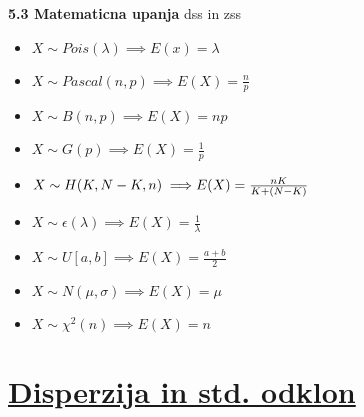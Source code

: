 \documentclass{article}
\begin{document}
\begin{multicols}{3}
\textbf{5.3 Matematicna upanja} dss in zss
\begin{itemize}
    \item \begin{math}
        X \sim Pois(\lambda) \implies E(x) = \lambda
    \end{math}
    \item \begin{math}
        X \sim Pascal(n, p) \implies E(X) = \frac{n}{p}
    \end{math}
    \item \begin{math}
        X \sim B(n, p) \implies E(X) = np
    \end{math}
    \item \begin{math}
        X \sim G(p) \implies E(X) = \frac{1}{p}
    \end{math}
    \item
        \begin{math}
            X \sim H(K, N-K, n) \implies\\ E(X) = \frac{nK}{K+(N-K)}
        \end{math}
    \item  \begin{math}
        X \sim \epsilon(\lambda) \implies E(X) = \frac{1}{\lambda}
    \end{math}
    \item \begin{math}
        X \sim U[a, b] \implies E(X) = \frac{a + b}{2}
    \end{math}
    \item \begin{math}
        X \sim N(\mu, \sigma ) \implies E(X) = \mu
    \end{math}
    \item \begin{math}
        X \sim \chi^{2}(n) \implies E(X) = n
    \end{math}
\end{itemize}

\section{\underline{Disperzija in std. odklon}}


\end{multicols}
\end{document}

